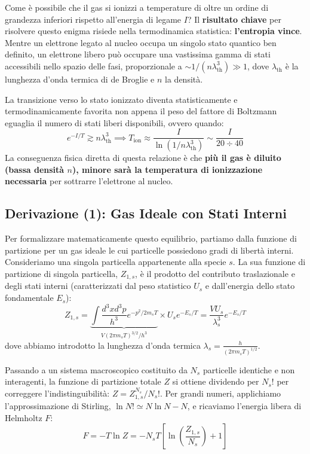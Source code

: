 Come è possibile che il gas si ionizzi a temperature di oltre un ordine di grandezza inferiori rispetto all'energia di legame $I$? Il \textbf{risultato chiave} per risolvere questo enigma risiede nella termodinamica statistica: \textbf{l'entropia vince}.
Mentre un elettrone legato al nucleo occupa un singolo stato quantico ben definito, un elettrone libero può occupare una vastissima gamma di stati accessibili nello spazio delle fasi, proporzionale a $\sim 1/(n\lambda_{\text{th}}^3) \gg 1$, dove $\lambda_{\text{th}}$ è la lunghezza d'onda termica di de Broglie e $n$ la densità.

La transizione verso lo stato ionizzato diventa statisticamente e termodinamicamente favorita non appena il peso del fattore di Boltzmann eguaglia il numero di stati liberi disponibili, ovvero quando:
\begin{equation}
e^{-I/T} \gtrsim n\lambda_{\text{th}}^3 \implies T_{\text{ion}} \approx \frac{I}{\ln(1/n\lambda_{\text{th}}^3)} \sim \frac{I}{20 \div 40}
\end{equation}
La conseguenza fisica diretta di questa relazione è che \textbf{più il gas è diluito (bassa densità $n$), minore sarà la temperatura di ionizzazione necessaria} per sottrarre l'elettrone al nucleo.

\subsection{Derivazione (1): Gas Ideale con Stati Interni}
Per formalizzare matematicamente questo equilibrio, partiamo dalla funzione di partizione per un gas ideale le cui particelle possiedono gradi di libertà interni. Consideriamo una singola particella appartenente alla specie $s$. La sua funzione di partizione di singola particella, $Z_{1,s}$, è il prodotto del contributo traslazionale e degli stati interni (caratterizzati dal peso statistico $U_s$ e dall'energia dello stato fondamentale $E_s$):
\begin{equation}
Z_{1,s} = \underbrace{\int \frac{d^3x d^3p}{h^3} e^{-p^2/2m_sT}}_{V (2\pi m_s T)^{3/2} / h^3} \times U_s e^{-E_s/T} = \frac{V U_s}{\lambda_s^3} e^{-E_s/T}
\end{equation}
dove abbiamo introdotto la lunghezza d'onda termica $\lambda_s = \frac{h}{(2\pi m_s T)^{1/2}}$.

Passando a un sistema macroscopico costituito da $N_s$ particelle identiche e non interagenti, la funzione di partizione totale $Z$ si ottiene dividendo per $N_s!$ per correggere l'indistinguibilità: $Z = Z_{1,s}^{N_s}/N_s!$.
Per grandi numeri, applichiamo l'approssimazione di Stirling, $\ln N! \simeq N\ln N - N$, e ricaviamo l'energia libera di Helmholtz $F$:
\begin{equation}
F = -T \ln Z = -N_s T \left[ \ln \left( \frac{Z_{1,s}}{N_s} \right) + 1 \right]
\end{equation}

